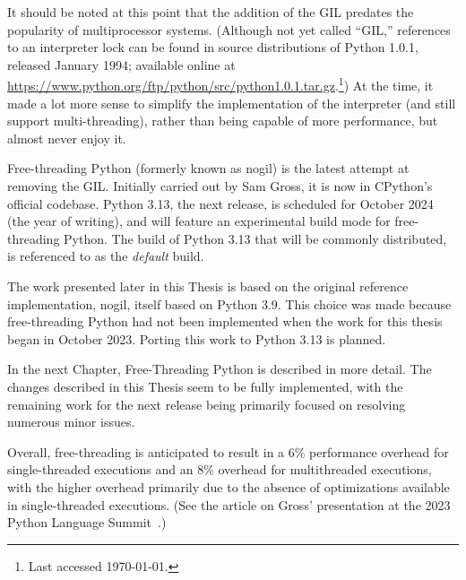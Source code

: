 It should be noted at this point that the addition of the GIL predates the popularity of multiprocessor systems.
(Although not yet called ``GIL,'' references to an interpreter lock can be found in source distributions of Python 1.0.1, released January 1994; available online at \url{https://www.python.org/ftp/python/src/python1.0.1.tar.gz}.\footnote{Last accessed \today.})
At the time, it made a lot more sense to simplify the implementation of the interpreter (and still support multi-threading), rather than being capable of more performance, but almost never enjoy it.

Free-threading Python (formerly known as nogil) is the latest attempt at removing the GIL\@.
Initially carried out by Sam Gross, it is now in CPython's official codebase.
Python 3.13, the next release, is scheduled for October 2024 (the year of writing), and will feature an experimental build mode for free-threading Python.
The build of Python 3.13 that will be commonly distributed, is referenced to as the \emph{default} build.

The work presented later in this Thesis is based on the original reference implementation, nogil, itself based on Python 3.9.
This choice was made because free-threading Python had not been implemented when the work for this thesis began in October 2023.
Porting this work to Python 3.13 is planned.

In the next Chapter, Free-Threading Python is described in more detail.
The changes described in this Thesis seem to be fully implemented, with the remaining work for the next release being primarily focused on resolving numerous minor issues.

Overall, free-threading is anticipated to result in a 6\% performance overhead for single-threaded executions and an 8\% overhead for multithreaded executions, with the higher overhead primarily due to the absence of optimizations available in single-threaded executions.
(See the article on Gross' presentation at the 2023 Python Language Summit~\cite{python-summit-2023-nogil}.)
